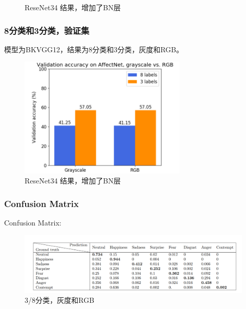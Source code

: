 \documentclass[11pt, a4paper]{article}
\begin{document}
\begin{CJK}{UTF8}{gbsn}
\begin{figure}[htbp]
	\caption{ReseNet34 结果，增加了BN层}
	\label{Fig:result2}
\end{figure}

\subsubsection{8分类和3分类，验证集}

模型为BKVGG12，结果为8分类和3分类，灰度和RGB。

\newpage

\begin{figure}[htbp]
	
	\centering %
	\includegraphics[width=8cm]{result2}
	
	\caption{ReseNet34 结果，增加了BN层}
	\label{Fig:result3}
\end{figure}

\subsubsection{Confusion Matrix}

Confusion Matrix:

\begin{figure}[htbp]
	
	\centering %
	\includegraphics[width=15cm]{confusion}
	
	\caption{3/8分类，灰度和RGB}
	\label{Fig:cm}
\end{figure}



\end{CJK}
\end{document}
